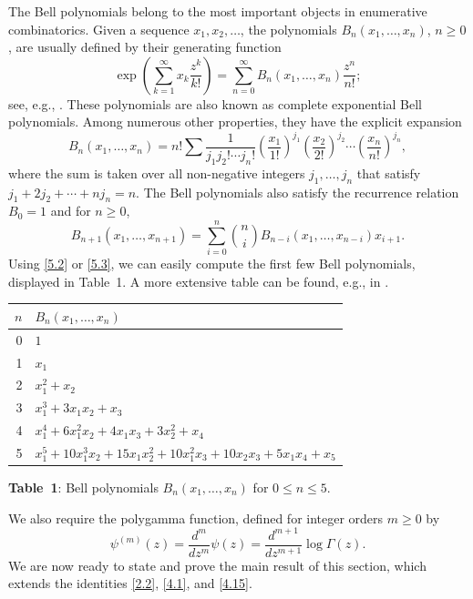 \documentclass{amsart}
\theoremstyle{definition}
\theoremstyle{remark}
\numberwithin{equation}{section}
\begin{document}
The Bell polynomials belong to the most important objects in enumerative
combinatorics. Given a sequence $x_1, x_2,\ldots$, the polynomials
$B_n(x_1,\ldots,x_n)$, $n\geq 0$, are usually defined by their generating 
function
\begin{equation}\label{5.1}
\exp\left(\sum_{k=1}^\infty x_k\frac{z^k}{k!}\right)
=\sum_{n=0}^\infty B_n(x_1,\ldots,x_n)\frac{z^n}{n!};
\end{equation}
see, e.g., \cite[p.~133ff.]{Co}. These polynomials are also known as complete
exponential Bell polynomials. Among numerous other properties, they have the
explicit expansion
\begin{equation}\label{5.2}
B_n(x_1,\ldots,x_n) = n!\sum\frac{1}{j_1j_2!\cdots j_n!}
\left(\frac{x_1}{1!}\right)^{j_1}\left(\frac{x_2}{2!}\right)^{j_2}\cdots
\left(\frac{x_n}{n!}\right)^{j_n},
\end{equation}
where the sum is taken over all non-negative integers $j_1,\ldots,j_n$ that
satisfy $j_1+2j_2+\cdots+nj_n=n$. The Bell polynomials also satisfy the 
recurrence relation $B_0=1$ and for $n\geq 0$,
\begin{equation}\label{5.3}
B_{n+1}(x_1,\ldots,x_{n+1}) 
= \sum_{i=0}^n\binom{n}{i}B_{n-i}(x_1,\ldots,x_{n-i})x_{i+1}.
\end{equation}
Using \eqref{5.2} or \eqref{5.3}, we can easily compute the first few Bell
polynomials, displayed in Table~1. A more extensive table can be found, e.g.,
in \cite[p.~307]{Co}.

\bigskip
\begin{center}
{\renewcommand{\arraystretch}{1.2}
\begin{tabular}{|r|l|}
\hline
$n$ & $B_n(x_1,\ldots,x_n)$ \\
\hline
0 & $1$ \\
1 & $x_1$ \\
2 & $x_1^2+x_2$ \\
3 & $x_1^3+3x_1x_2+x_3$ \\
4 & $x_1^4+6x_1^2x_2+4x_1x_3+3x_2^2+x_4$ \\
5 & $x_1^5+10x_1^3x_2+15x_1x_2^2+10x_1^2x_3+10x_2x_3+5x_1x_4+x_5$ \\
\hline
\end{tabular}}

\medskip
{\bf Table~1}: Bell polynomials $B_n(x_1,\ldots,x_n)$ for $0\leq n\leq 5$.
\end{center}

\bigskip
We also require the polygamma function, defined for integer orders $m\geq 0$ by
\begin{equation}\label{5.4}
\psi^{(m)}(z) = \frac{d^m}{dz^m}\psi(z)=\frac{d^{m+1}}{dz^{m+1}}\log{\Gamma(z)}.
\end{equation}
We are now ready to state and prove the main result of this section, which 
extends the identities \eqref{2.2}, \eqref{4.1}, and \eqref{4.15}.
\end{document}

